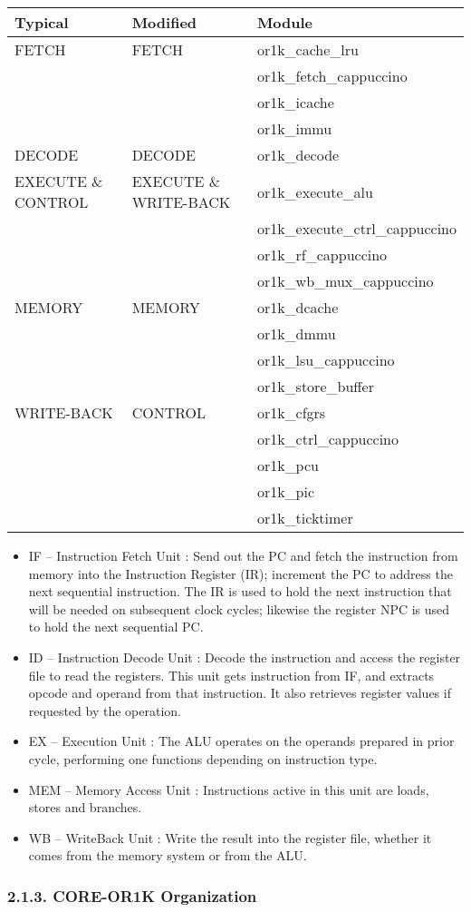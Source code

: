\documentclass[]{article}
\begin{document}
\begin{longtable}[]{@{}lll@{}}
\toprule
Typical & Modified & Module\tabularnewline
\midrule
\endhead
FETCH & FETCH & or1k\_cache\_lru\tabularnewline
& & or1k\_fetch\_cappuccino\tabularnewline
& & or1k\_icache\tabularnewline
& & or1k\_immu\tabularnewline
DECODE & DECODE & or1k\_decode\tabularnewline
EXECUTE \& CONTROL & EXECUTE \& WRITE-BACK &
or1k\_execute\_alu\tabularnewline
& & or1k\_execute\_ctrl\_cappuccino\tabularnewline
& & or1k\_rf\_cappuccino\tabularnewline
& & or1k\_wb\_mux\_cappuccino\tabularnewline
MEMORY & MEMORY & or1k\_dcache\tabularnewline
& & or1k\_dmmu\tabularnewline
& & or1k\_lsu\_cappuccino\tabularnewline
& & or1k\_store\_buffer\tabularnewline
WRITE-BACK & CONTROL & or1k\_cfgrs\tabularnewline
& & or1k\_ctrl\_cappuccino\tabularnewline
& & or1k\_pcu\tabularnewline
& & or1k\_pic\tabularnewline
& & or1k\_ticktimer\tabularnewline
\bottomrule
\end{longtable}

\begin{itemize}
\item
  IF -- Instruction Fetch Unit : Send out the PC and fetch the
  instruction from memory into the Instruction Register (IR); increment
  the PC to address the next sequential instruction. The IR is used to
  hold the next instruction that will be needed on subsequent clock
  cycles; likewise the register NPC is used to hold the next sequential
  PC.
\item
  ID -- Instruction Decode Unit : Decode the instruction and access the
  register file to read the registers. This unit gets instruction from
  IF, and extracts opcode and operand from that instruction. It also
  retrieves register values if requested by the operation.
\item
  EX -- Execution Unit : The ALU operates on the operands prepared in
  prior cycle, performing one functions depending on instruction type.
\item
  MEM -- Memory Access Unit : Instructions active in this unit are
  loads, stores and branches.
\item
  WB -- WriteBack Unit : Write the result into the register file,
  whether it comes from the memory system or from the ALU.
\end{itemize}

\subsubsection{2.1.3. CORE-OR1K
Organization}\label{core-or1k-organization}
\end{document}
